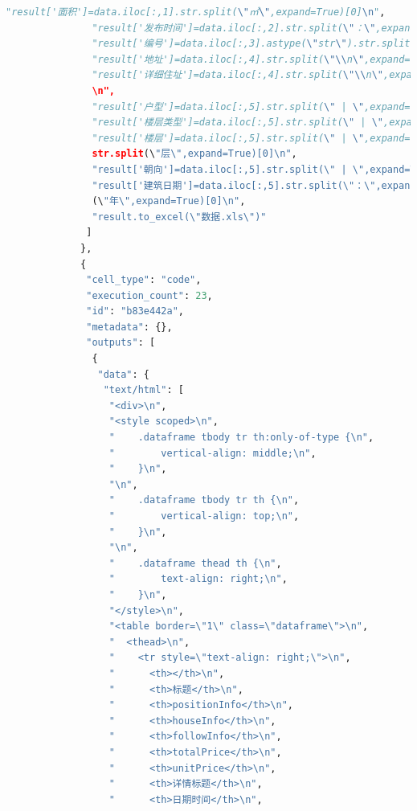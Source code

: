 \documentclass[withoutpreface,bwprint]{cumcmthesis} %
\begin{document}
\begin{appendices}
\begin{lstlisting}[language=Python]
               "result['面积']=data.iloc[:,1].str.split(\"㎡\",expand=True)[0]\n",
               "result['发布时间']=data.iloc[:,2].str.split(\"：\",expand=True)[1]\n",
               "result['编号']=data.iloc[:,3].astype(\"str\").str.split(\".\",expand=True)[0]\n",
               "result['地址']=data.iloc[:,4].str.split(\"\\n\",expand=True)[0]\n",
               "result['详细住址']=data.iloc[:,4].str.split(\"\\n\",expand=True)[1].str.strip()
               \n",
               "result['户型']=data.iloc[:,5].str.split(\" | \",expand=True)[0]\n",
               "result['楼层类型']=data.iloc[:,5].str.split(\" | \",expand=True)[2].str.split(\"/\",expand=True)[0]\n",
               "result['楼层']=data.iloc[:,5].str.split(\" | \",expand=True)[2].str.split(\"/\",expand=True)[1].
               str.split(\"层\",expand=True)[0]\n",
               "result['朝向']=data.iloc[:,5].str.split(\" | \",expand=True)[4].str.split(\"  \",expand=True)[0]\n",
               "result['建筑日期']=data.iloc[:,5].str.split(\"：\",expand=True)[1].str.split
               (\"年\",expand=True)[0]\n",
               "result.to_excel(\"数据.xls\")"
              ]
             },
             {
              "cell_type": "code",
              "execution_count": 23,
              "id": "b83e442a",
              "metadata": {},
              "outputs": [
               {
                "data": {
                 "text/html": [
                  "<div>\n",
                  "<style scoped>\n",
                  "    .dataframe tbody tr th:only-of-type {\n",
                  "        vertical-align: middle;\n",
                  "    }\n",
                  "\n",
                  "    .dataframe tbody tr th {\n",
                  "        vertical-align: top;\n",
                  "    }\n",
                  "\n",
                  "    .dataframe thead th {\n",
                  "        text-align: right;\n",
                  "    }\n",
                  "</style>\n",
                  "<table border=\"1\" class=\"dataframe\">\n",
                  "  <thead>\n",
                  "    <tr style=\"text-align: right;\">\n",
                  "      <th></th>\n",
                  "      <th>标题</th>\n",
                  "      <th>positionInfo</th>\n",
                  "      <th>houseInfo</th>\n",
                  "      <th>followInfo</th>\n",
                  "      <th>totalPrice</th>\n",
                  "      <th>unitPrice</th>\n",
                  "      <th>详情标题</th>\n",
                  "      <th>日期时间</th>\n",

\end{lstlisting}
\end{appendices}
\end{document}
